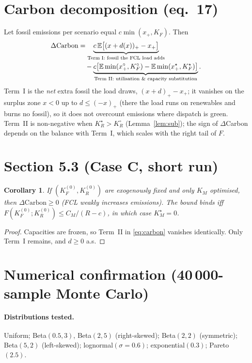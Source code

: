\documentclass[11pt]{article}
\newtheorem{corollary}{Corollary}
\theoremstyle{definition}
\begin{document}
\section{Carbon decomposition (eq.~17)}
Let fossil emissions per scenario equal $c\min(x_+,K_F)$. Then
\begin{align}
\Delta\text{Carbon}
&= \underbrace{c\,\mathbb E\bigl[(x+d(x))_+ - x_+\bigr]}_{\text{Term I: fossil the FCL load adds}} \notag\\
&\quad - \underbrace{c\bigl[\mathbb E\min(x_+^{\circ},K_F^{\circ})-\mathbb E\min(x_+^{\star},K_F^{\star})\bigr]}_{\text{Term II: utilisation \& capacity substitution}}. \label{eq:carbon}
\end{align}
Term~I is the \emph{net} extra fossil the load draws, $(x+d)_+-x_+$; it vanishes on the surplus zone $x<0$ up to $d\le(-x)_+$ (there the load runs on renewables and burns no fossil), so it does not overcount emissions where dispatch is green. Term~II is non-negative when $K_R^{\star}>K_R^{\circ}$ (Lemma~\ref{lem:sub}); the sign of $\Delta$Carbon depends on the balance with Term~I, which scales with the right tail of $F$.

\section{Section 5.3 (Case C, short run)}
\begin{corollary}\label{cor:caseC}
If $(K_F^{(0)},K_R^{(0)})$ are exogenously fixed and only $K_M$ optimised, then $\Delta\text{Carbon}\ge 0$ (FCL weakly increases emissions). The bound binds iff $F(K_F^{(0)};K_R^{(0)})\le C_M/(R-c)$, in which case $K_M^{\star}=0$.
\end{corollary}

\begin{proof}
Capacities are frozen, so Term~II in \eqref{eq:carbon} vanishes identically. Only Term~I remains, and $d\ge 0$ a.s.
\end{proof}

\section{Numerical confirmation (40\,000-sample Monte Carlo)}

\paragraph{Distributions tested.}
Uniform; Beta$(0.5,3)$, Beta$(2,5)$ (right-skewed); Beta$(2,2)$ (symmetric); Beta$(5,2)$ (left-skewed); lognormal$(\sigma{=}0.6)$; exponential$(0.3)$; Pareto$(2.5)$.
\end{document}
